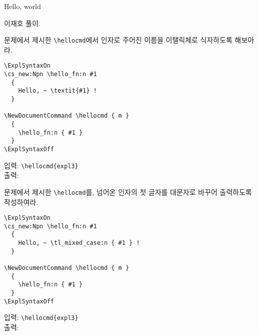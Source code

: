 \documentclass[a4paper,amsmath,itemph]{oblivoir}
\begin{document}
\begin{intro}
  Hello, world
\end{intro}

이재호 풀이.

\medskip

\begin{tcolorbox}[title={연습문제 1},fonttitle=\sffamily]
문제에서 제시한 \verb|\hellocmd|에서 인자로 주어진 이름을 이탤릭체로 식자하도록 해보아라.

\tcblower

\begin{verbatim}
\ExplSyntaxOn
\cs_new:Npn \hello_fn:n #1
  {
    Hello, ~ \textit{#1} !
  }

\NewDocumentCommand \hellocmd { m }
  {
    \hello_fn:n { #1 }
  }
\ExplSyntaxOff
\end{verbatim}

\begin{tcolorbox}{}
입력: \verb|\hellocmd{expl3}|\\
출력: 
\end{tcolorbox}

\end{tcolorbox}

\begin{tcolorbox}[title={연습문제 2},fonttitle=\sffamily]
문제에서 제시한 \verb|\hellocmd|를, 넘어온 인자의 첫 글자를 대문자로 바꾸어 출력하도록 작성하여라.

\tcblower

\begin{verbatim}
\ExplSyntaxOn
\cs_new:Npn \hello_fn:n #1
  {
    Hello, ~ \tl_mixed_case:n { #1 } !
  }

\NewDocumentCommand \hellocmd { m }
  {
    \hello_fn:n { #1 }
  }
\ExplSyntaxOff
\end{verbatim}

\begin{tcolorbox}{}
입력: \verb|\hellocmd{expl3}|\\
출력: 
\end{tcolorbox}

\end{tcolorbox}
\end{document}
